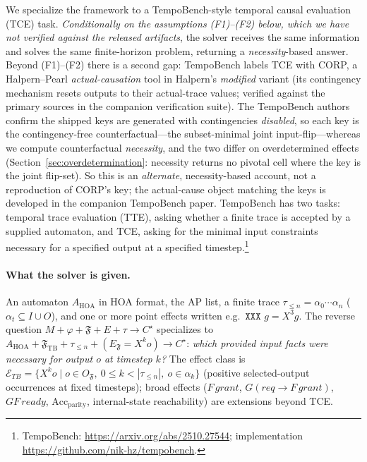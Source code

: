 \documentclass[11pt]{article}
\theoremstyle{remark}
\newcommand{\Frame}{\mathfrak{F}}
\begin{document}
We specialize the framework to a TempoBench-style temporal causal evaluation
(TCE) task. \emph{Conditionally on the assumptions (F1)--(F2) below, which we have
not verified against the released artifacts}, the solver receives the same
information and solves the same finite-horizon problem, returning a
\emph{necessity}-based answer. Beyond (F1)--(F2) there is a second gap: TempoBench
labels TCE with CORP, a Halpern--Pearl \emph{actual-causation} tool in Halpern's
\emph{modified} variant (its contingency mechanism resets outputs to their
actual-trace values; verified against the primary sources in the companion
verification suite). The TempoBench authors confirm the shipped keys are
generated with contingencies \emph{disabled}, so each key is the
contingency-free counterfactual---the subset-minimal joint input-flip---whereas we
compute counterfactual \emph{necessity}, and the two differ on overdetermined
effects (Section~\ref{sec:overdetermination}: necessity returns no pivotal cell
where the key is the joint flip-set). So this is an \emph{alternate},
necessity-based account, not a reproduction of CORP's key; the actual-cause object
matching the keys is developed in the companion TempoBench paper. TempoBench has two tasks: temporal trace evaluation (TTE), asking whether a
finite trace is accepted by a supplied automaton, and TCE, asking for the minimal
input constraints necessary for a specified output at a specified
timestep.\footnote{TempoBench: \url{https://arxiv.org/abs/2510.27544};
implementation \url{https://github.com/nik-hz/tempobench}.}

\paragraph{What the solver is given.} An automaton \(A_{\mathrm{HOA}}\) in HOA
format, the AP list, a finite trace \(\tau_{\le n}=\alpha_0\cdots\alpha_n\)
(\(\alpha_t\subseteq I\cup O\)), and one or more point effects written e.g.\
\(\texttt{XXX }g=X^3 g\). The reverse question
\(M+\varphi+\Frame+E+\tau\to C^\star\) specializes to
\(A_{\mathrm{HOA}}+\Frame_{\mathrm{TB}}+\tau_{\le n}+(E_{\Frame}=X^k o)\to C^\star\):
\emph{which provided input facts were necessary for output \(o\) at timestep
\(k\)?} The effect class is
\(\mathcal{E}_{TB}=\{X^k o\mid o\in O_{\Frame},\ 0\le k<|\tau_{\le n}|,\
o\in\alpha_k\}\) (positive selected-output occurrences at fixed timesteps); broad
effects (\(F\,grant\), \(G(req\to F\,grant)\), \(GF\,ready\),
\(\mathrm{Acc}_{\mathrm{parity}}\), internal-state reachability) are extensions
beyond TCE.
\end{document}
